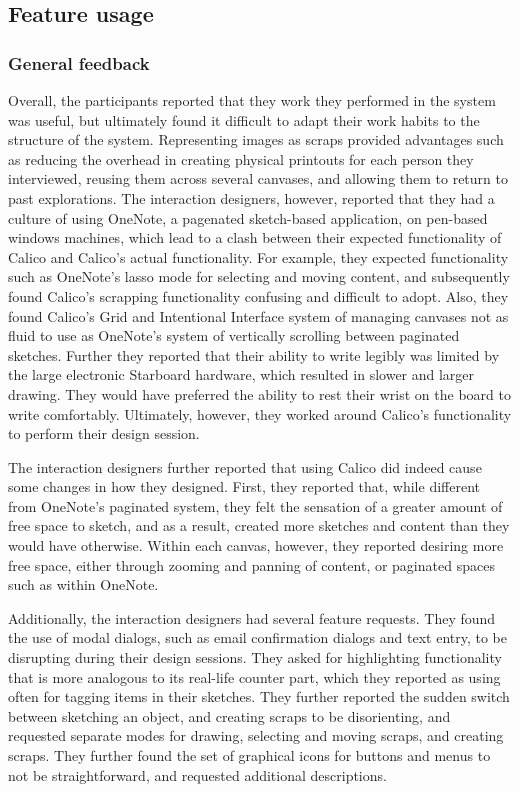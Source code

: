 \subsection{Feature usage}

\subsubsection{General feedback}

Overall, the participants reported that they work they performed in the system was useful, but ultimately found it difficult to adapt their work habits to the structure of the system. Representing images as scraps provided advantages such as reducing the overhead in creating physical printouts for each person they interviewed, reusing them across several canvases, and allowing them to return to past explorations. The interaction designers, however, reported that they had a culture of using OneNote, a pagenated sketch-based application, on pen-based windows machines, which lead to a clash between their expected functionality of Calico and Calico's actual functionality. For example, they expected functionality such as OneNote's lasso mode for selecting and moving content, and subsequently found Calico's scrapping functionality confusing and difficult to adopt. Also, they found Calico's Grid and Intentional Interface system of managing canvases not as fluid to use as OneNote's system of vertically scrolling between paginated sketches. Further they reported that their ability to write legibly was limited by the large electronic Starboard hardware, which resulted in slower and larger drawing. They would have preferred the ability to rest their wrist on the board to write comfortably. Ultimately, however, they worked around Calico's functionality to perform their design session.

The interaction designers further reported that using Calico did indeed cause some changes in how they designed. First, they reported that, while different from OneNote's paginated system, they felt the sensation of a greater amount of free space to sketch, and as a result, created more sketches and content than they would have otherwise. Within each canvas, however, they reported desiring more free space, either through zooming and panning of content, or paginated spaces such as within OneNote. 

Additionally, the interaction designers had several feature requests. They found the use of modal dialogs, such as email confirmation dialogs and text entry, to be disrupting during their design sessions. They asked for highlighting functionality that is more analogous to its real-life counter part, which they reported as using often for tagging items in their sketches. They further reported the sudden switch between sketching an object, and creating scraps to be disorienting, and requested separate modes for drawing, selecting and moving scraps, and creating scraps. They further found the set of graphical icons for buttons and menus to not be straightforward, and requested additional descriptions.

